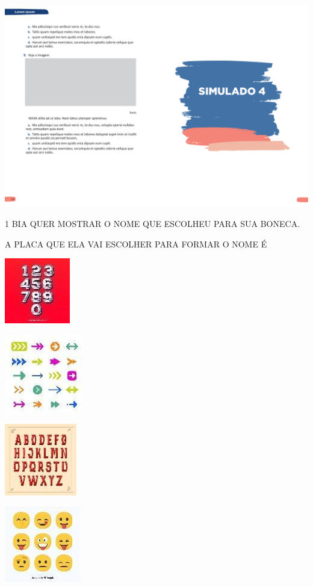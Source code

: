 \blankpage

\vspace*{-4.2cm}
\hspace*{-4cm}\includegraphics[scale=1]{../watermarks/4simulado5ano.pdf}


\pagebreak

\num{1} BIA QUER MOSTRAR O NOME QUE ESCOLHEU PARA SUA BONECA.

A PLACA QUE ELA VAI ESCOLHER PARA FORMAR O NOME É

\begin{escolha}
\item \includegraphics[width=.15\textwidth]{media/image239.jpg}

\item \includegraphics[width=.15\textwidth]{media/image240.jpg}

\item \includegraphics[width=.15\textwidth]{media/image241.jpg}

\item \includegraphics[width=.15\textwidth]{media/image242.jpg}
\end{escolha}

